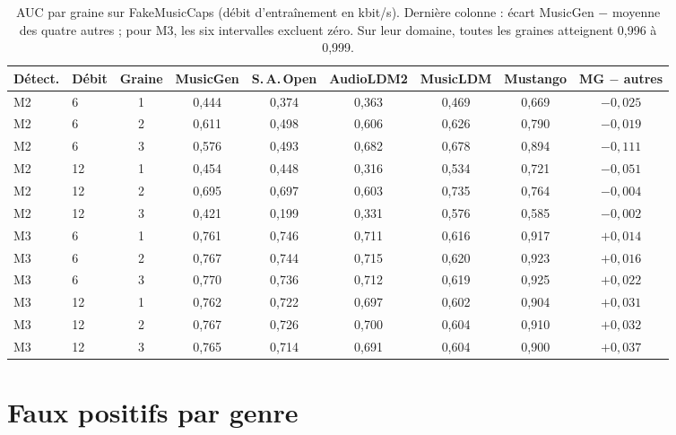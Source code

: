 \documentclass[a4paper, 11pt]{article}
\begin{document}
\begin{table}[H]
    \centering
    \footnotesize
    \setlength{\tabcolsep}{4.5pt}
    \begin{tabular}{llccccccc}
        \toprule
        Détect. & Débit & Graine & MusicGen & S.\,A.\,Open & AudioLDM2 & MusicLDM & Mustango & MG $-$ autres \\
        \midrule
        M2 & 6  & 1 & 0,444 & 0,374 & 0,363 & 0,469 & 0,669 & $-0{,}025$ \\
        M2 & 6  & 2 & 0,611 & 0,498 & 0,606 & 0,626 & 0,790 & $-0{,}019$ \\
        M2 & 6  & 3 & 0,576 & 0,493 & 0,682 & 0,678 & 0,894 & $-0{,}111$ \\
        M2 & 12 & 1 & 0,454 & 0,448 & 0,316 & 0,534 & 0,721 & $-0{,}051$ \\
        M2 & 12 & 2 & 0,695 & 0,697 & 0,603 & 0,735 & 0,764 & $-0{,}004$ \\
        M2 & 12 & 3 & 0,421 & 0,199 & 0,331 & 0,576 & 0,585 & $-0{,}002$ \\
        \midrule
        M3 & 6  & 1 & 0,761 & 0,746 & 0,711 & 0,616 & 0,917 & $+0{,}014$ \\
        M3 & 6  & 2 & 0,767 & 0,744 & 0,715 & 0,620 & 0,923 & $+0{,}016$ \\
        M3 & 6  & 3 & 0,770 & 0,736 & 0,712 & 0,619 & 0,925 & $+0{,}022$ \\
        M3 & 12 & 1 & 0,762 & 0,722 & 0,697 & 0,602 & 0,904 & $+0{,}031$ \\
        M3 & 12 & 2 & 0,767 & 0,726 & 0,700 & 0,604 & 0,910 & $+0{,}032$ \\
        M3 & 12 & 3 & 0,765 & 0,714 & 0,691 & 0,604 & 0,900 & $+0{,}037$ \\
        \bottomrule
    \end{tabular}
    \caption{AUC par graine sur FakeMusicCaps (débit d'entraînement en kbit/s). Dernière colonne : écart
    MusicGen $-$ moyenne des quatre autres ; pour M3, les six intervalles excluent zéro. Sur leur domaine,
    toutes les graines atteignent 0,996 à 0,999.}
\end{table}

\section{Faux positifs par genre}
\label{app:genre}
\end{document}
